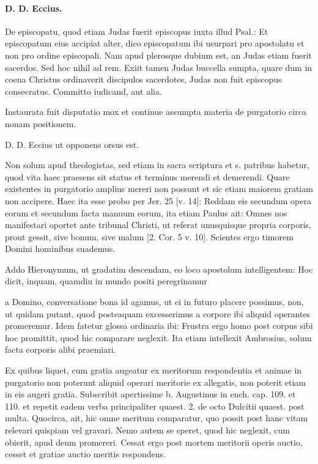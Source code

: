 \paragraph*{D. D. Eccius.}

De episcopatu, quod etiam Judas fuerit episcopus iuxta illud Psal.: Et episcopatum eius accipiat alter, dico episcopatum ibi usurpari pro apostolatu et non pro ordine episcopali. Nam apud plerosque dubium est, an Judas etiam fuerit sacerdos. Sed hoc nihil ad rem. Exiit tamen Judas buccella sumpta, quare dum in coena Christus ordinaverit discipulos sacerdotes, Judas non fuit episcopus consecratus. Committo iudicand, aut alia.

Instaurata fuit disputatio mox et continue assumpta materia de purgatorio circa nonam positionem.

D. D. Eccius ut opponens orsus est.

Non solum apud theologistas, sed etiam in sacra scriptura et s. patribus habetur, quod vita haec praesens sit status et terminus merendi et demerendi. Quare existentes in purgatorio amplius mereri non possunt et sic etiam maiorem gratiam non accipere. Haec ita esse probo per Jer. 25 [v. 14]: Reddam eis secundum opera eorum et secundum facta manuum eorum, ita etiam Paulus ait: Omnes nos manifestari oportet ante tribunal Christi, ut referat unusquisque propria corporis, prout gessit, sive bonum, sive malum [2. Cor. 5 v. 10]. Scientes ergo timorem Domini hominibus suademus.

Addo Hieronymum, ut gradatim descendam, eo loco apostolum intelligentem: Hoc dicit, inquam, quamdiu in mundo positi peregrinamur

a Domino, conversatione bona id agamus, ut ei in futuro placere possimus, non, ut quidam putant, quod posteaquam excesserimus a corpore ibi aliquid operantes promeremur. Idem fatetur glossa ordinaria ibi: Frustra ergo homo post corpus sibi hoc promittit, quod hic comparare neglexit. Ita etiam intellexit Ambrosius, solum facta corporis alibi praemiari.

Ex quibus liquet, cum gratia augeatur ex meritorum respondentia et animae in purgatorio non poterunt aliquid operari meritorie ex allegatis, non \marginpar{\small[323]} poterit etiam in eis augeri gratia. Subscribit apertissime b. Augustinus in ench. cap. 109. et 110. et repetit eadem verba principaliter quaest. 2. de octo Dulcitii quaest. post multa. Quocirca, ait, hic omne meritum comparatur, quo possit post hanc vitam relevari quispiam vel gravari. Nemo autem se speret, quod hic neglexit, cum obierit, apud deum promereri. Cessat ergo post mortem meritorii operis auctio, cesset et gratiae auctio meritis respondens.

